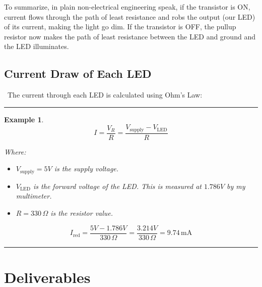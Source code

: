 \documentclass[12pt]{report}
\newtheorem{example}{Example}
\newenvironment{examp}
{\vspace{0.5cm}
\hrule
\begin{example}}
{\hrule
\vspace{0.5cm}
\end{example}}
\begin{document}
To summarize, in plain non-electrical engineering speak, if the transistor is ON, current flows through the path of least resistance and robs the output (our LED) of its current, making the light go dim. If the transistor is OFF, the pullup resistor now makes the path of least resistance between the LED and ground and the LED illuminates.
\subsection*{Current Draw of Each LED} \
The current through each LED is calculated using Ohm's Law:
\begin{examp}
	\[
		I = \frac{V_{R}}{R} = \frac{V_{\text{supply}} - V_{\text{LED}}}{R}
	\]
	
	Where:
	\begin{itemize}
		\item \( V_{\text{supply}} = 5V \) is the supply voltage.
		\item \( V_{\text{LED}} \) is the forward voltage of the LED.
		      This is measured at \(1.786V\) by my multimeter.
		\item \( R = 330 \, \Omega \) is the resistor value.
	\end{itemize}
	\[
		I_{\text{red}} = \frac{5V - 1.786V}{330 \, \Omega} = \frac{3.214V}{330 \, \Omega} = 9.74 \, \text{mA}
	\]
\end{examp}
\pagebreak
\section*{Deliverables}
\end{document}
